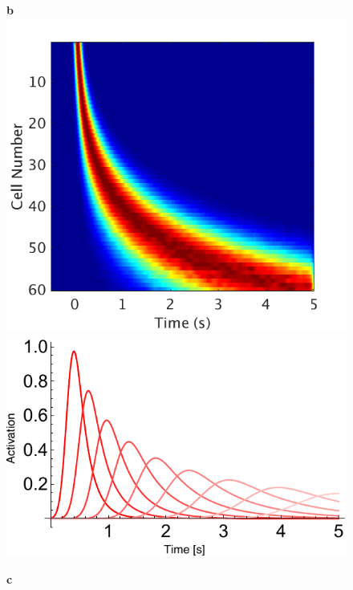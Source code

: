 \documentclass{apa}
\begin{document}
\begin{figure}
\begin{minipage}{.25\linewidth}
\begin{center}
		\end{center}
	\end{minipage}
	\begin{minipage}{.25\linewidth}
		\textbf{b}
		\includegraphics[width=.99\linewidth]{figs/HeatmapTimeCellsV2.png}
		\includegraphics[width=.99\linewidth]{figs/TimeCellParams.pdf}
	\end{minipage}
	\begin{minipage}{0.5\linewidth}
		\textbf{c}
		\begin{center}

\end{center}
\end{minipage}
\end{figure}
\end{document}
